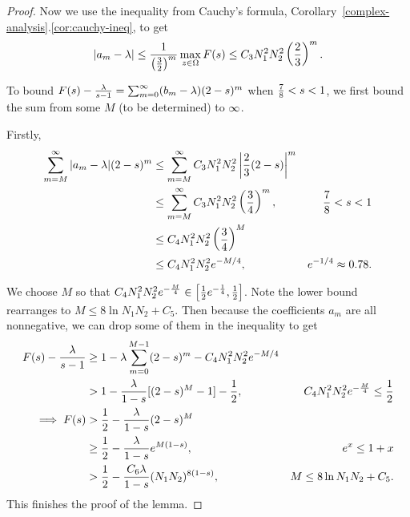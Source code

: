 \begin{proof}
Now we use the inequality from Cauchy's formula, Corollary~\ref{complex-analysis}.\ref{cor:cauchy-ineq}, to get
\[
|a_m-\lambda |\le \frac{1}{\left( {\frac{3}{2}} \right)^m}\max_{z\in \Omega}F(s)\le C_3N_1^2N_2^2\left( {\frac{2}{3}} \right)^m.
\]

To bound $F(s)-\frac{\lambda}{s-1}=\sum_{m=0}^{\infty}(b_m-\lambda)(2-s)^m$ when $\frac{7}{8}<s<1$, we first bound the sum from some $M$ (to be determined) to $\infty$.

Firstly,
\begin{align*}
\sum_{m=M}^{\infty}|a_m-\lambda|(2-s)^m
&\le \sum_{m=M}^{\infty}
C_3N_1^2N_2^2\left| {\frac{2}{3}(2-s)} \right|^m\\
&\le \sum_{m=M}^{\infty}
C_3N_1^2N_2^2\left( {\frac{3}{4}} \right)^m,& \frac{7}{8}<s<1\\
&\le C_4N_1^2N_2^2\left( {\frac{3}{4}} \right)^M\\
&\le C_4N_1^2N_2^2e^{-M/4},&e^{-1/4}\approx 0.78.
\end{align*}

We choose $M$ so that $C_4N_1^2N_2^2e^{-\frac{M}{4}}\in \left[ {\frac{1}{2}e^{-\frac{1}{4}},\frac{1}{2}} \right]$. Note the lower bound rearranges to $M\le 8\ln N_1N_2+C_5$. 
Then because the coefficients $a_m$ are all nonnegative, we can drop some of them in the inequality to get
\begin{align*}
F(s)-\frac{\lambda}{s-1}&\ge 1-\lambda \sum_{m=0}^{M-1} (2-s)^m - C_4N_1^2N_2^2e^{-M/4}\\
&>1-\frac{\lambda}{1-s}[(2-s)^M-1]-\frac{1}{2},&C_4N_1^2N_2^2e^{-\frac{M}{4}}\le\frac{1}{2}\\
\implies F(s)&>\frac{1}{2}-\frac{\lambda}{1-s}(2-s)^M\\
&\ge\frac{1}{2}-\frac{\lambda}{1-s}e^{M(1-s)},&e^x\le1+x\\
&>\frac{1}{2}-\frac{C_6\lambda }{1-s}(N_1N_2)^{8(1-s)},& M\le 8\ln N_1N_2+C_5.
\end{align*}
This finishes the proof of the lemma.
\end{proof}
